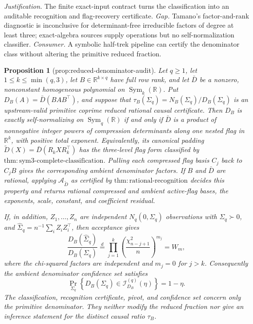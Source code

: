 \documentclass{article}
\newtheorem{proposition}{Proposition}
\begin{document}
\par\smallskip\noindent \textit{Justification.} The finite exact-input contract turns the classification into an auditable recognition and flag-recovery certificate. \textit{Gap.} Tamano's factor-and-rank diagnostic is inconclusive for determinant-free irreducible factors of degree at least three; exact-algebra sources supply operations but no self-normalization classifier. \textit{Consumer.} A symbolic half-trek pipeline can certify the denominator class without altering the primitive reduced fraction.

\begin{proposition}[prop:reduced-denominator-audit]\label{prop:reduced-denominator-audit}
Let \(q\geq1\), let \(1\leq k\leq\min(q,3)\), let
\(B\in\mathbb R^{k\times q}\) have full row rank, and let \(\bar D\)
be a nonzero, nonconstant homogeneous polynomial on
\(\operatorname{Sym}_k(\mathbb R)\).  Put
\(D_B(A)=\bar D(BAB^{\top})\), and suppose that
\(\tau_B(\Sigma_q)=N_B(\Sigma_q)/D_B(\Sigma_q)\) is an upstream-valid
primitive coprime reduced rational causal certificate.  Then \(D_B\) is
exactly self-normalizing on \(\operatorname{Sym}_q(\mathbb R)\) if and
only if \(\bar D\) is a product of nonnegative integer powers of
compression determinants along one nested flag in \(\mathbb R^k\),
with positive total exponent.  Equivalently, its canonical padding
\(\widetilde D(X)=\bar D(R_kXR_k^{\top})\) has the three-level flag form
classified by \(\mathrm{thm{:}sym3\text{-}complete\text{-}classification}\).
Pulling each compressed flag basis \(C_j\) back to \(C_jB\) gives the
corresponding ambient denominator factors.  If \(B\) and \(\bar D\)
are rational, applying \(\mathcal A_{\widetilde D}\) as certified by
\(\mathrm{thm{:}rational\text{-}recognition}\) decides this property and
returns rational compressed and ambient active-flag bases, the
exponents, scale, constant, and coefficient residual.

If, in addition, \(Z_1,\ldots,Z_n\) are independent
\(N_q(0,\Sigma_q)\) observations with \(\Sigma_q\succ0\), and
\(\widehat\Sigma_q=n^{-1}\sum_iZ_iZ_i^{\top}\), then acceptance gives
\[
 \frac{D_B(\widehat\Sigma_q)}{D_B(\Sigma_q)}
 \stackrel{d}{=}
 \prod_{j=1}^{k}
 \left(\frac{\chi^2_{n-j+1}}{n}\right)^{m_j}
 =W_m,
\]
where the chi-squared factors are independent and \(m_j=0\) for
\(j>k\).  Consequently the ambient denominator confidence set satisfies
\[
 \Pr_{\Sigma_q}\!\left\{D_B(\Sigma_q)
 \in\mathcal I_{D_B}^{(q)}(\eta)\right\}=1-\eta.
\]
The classification, recognition certificate, pivot, and confidence set
concern only the primitive denominator.  They neither modify the reduced
fraction nor give an inference statement for the distinct causal ratio
\(\tau_B\).
\end{proposition}
\end{document}
